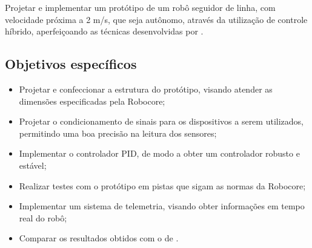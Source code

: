 Projetar e implementar um protótipo de um robô seguidor de linha, com velocidade próxima a 2 m/s, que seja autônomo,
através da utilização de controle 
híbrido, aperfeiçoando as técnicas desenvolvidas por .

\begin{spacing}{2}\end{spacing}
\subsection{Objetivos específicos}

 
\begin{itemize}

 \item Projetar e confeccionar a estrutura do protótipo, visando atender as dimensões especificadas pela Robocore;

  \item Projetar o condicionamento de sinais para os dispositivos a serem utilizados, permitindo 
  uma boa precisão na leitura dos sensores;
 
 \item Implementar o controlador PID, de modo a obter um controlador robusto e estável;
 
 \item Realizar testes com o protótipo em pistas que sigam as normas da Robocore;
 
 \item Implementar um sistema de telemetria, visando obter informações em tempo real do robô;
 
 \item Comparar os resultados obtidos com o de . 
 
\end{itemize}


